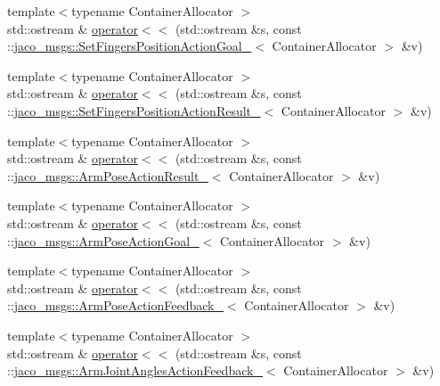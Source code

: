 \begin{DoxyCompactItemize}
\item 
{\footnotesize template$<$typename Container\+Allocator $>$ }\\std\+::ostream \& \hyperlink{namespacejaco__msgs_a73d1719df3f83e0b81c34562eb839701}{operator$<$$<$} (std\+::ostream \&s, const \+::\hyperlink{structjaco__msgs_1_1SetFingersPositionActionGoal__}{jaco\+\_\+msgs\+::\+Set\+Fingers\+Position\+Action\+Goal\+\_\+}$<$ Container\+Allocator $>$ \&v)
\item 
{\footnotesize template$<$typename Container\+Allocator $>$ }\\std\+::ostream \& \hyperlink{namespacejaco__msgs_ab158bf1114311b871f12f51de32ef756}{operator$<$$<$} (std\+::ostream \&s, const \+::\hyperlink{structjaco__msgs_1_1SetFingersPositionActionResult__}{jaco\+\_\+msgs\+::\+Set\+Fingers\+Position\+Action\+Result\+\_\+}$<$ Container\+Allocator $>$ \&v)
\item 
{\footnotesize template$<$typename Container\+Allocator $>$ }\\std\+::ostream \& \hyperlink{namespacejaco__msgs_a7d6e6b969362be0e63412ae49fa22db6}{operator$<$$<$} (std\+::ostream \&s, const \+::\hyperlink{structjaco__msgs_1_1ArmPoseActionResult__}{jaco\+\_\+msgs\+::\+Arm\+Pose\+Action\+Result\+\_\+}$<$ Container\+Allocator $>$ \&v)
\item 
{\footnotesize template$<$typename Container\+Allocator $>$ }\\std\+::ostream \& \hyperlink{namespacejaco__msgs_a30e7991fe2f8e4cad199071db738f2cb}{operator$<$$<$} (std\+::ostream \&s, const \+::\hyperlink{structjaco__msgs_1_1ArmPoseActionGoal__}{jaco\+\_\+msgs\+::\+Arm\+Pose\+Action\+Goal\+\_\+}$<$ Container\+Allocator $>$ \&v)
\item 
{\footnotesize template$<$typename Container\+Allocator $>$ }\\std\+::ostream \& \hyperlink{namespacejaco__msgs_a3ad871a2b8da2185aa16bad4b3da6b7c}{operator$<$$<$} (std\+::ostream \&s, const \+::\hyperlink{structjaco__msgs_1_1ArmPoseActionFeedback__}{jaco\+\_\+msgs\+::\+Arm\+Pose\+Action\+Feedback\+\_\+}$<$ Container\+Allocator $>$ \&v)
\item 
{\footnotesize template$<$typename Container\+Allocator $>$ }\\std\+::ostream \& \hyperlink{namespacejaco__msgs_ad68246f8f2de9034ed47fc64da9e0f64}{operator$<$$<$} (std\+::ostream \&s, const \+::\hyperlink{structjaco__msgs_1_1ArmJointAnglesActionFeedback__}{jaco\+\_\+msgs\+::\+Arm\+Joint\+Angles\+Action\+Feedback\+\_\+}$<$ Container\+Allocator $>$ \&v)
\item 

\end{DoxyCompactItemize}
